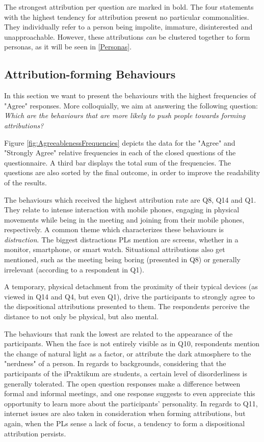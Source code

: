 The strongest attribution per question are marked in bold. The four statements with the highest tendency for attribution present no particular commonalities. They individually refer to a person being impolite, immature, disinterested and unapproachable. However, these attributions \textit{can} be clustered together to form personas, as it will be seen in \autoref{Personas}.

\subsection{Attribution-forming Behaviours}

In this section we want to present the behaviours with the highest frequencies of "Agree" responses. More colloquially, we aim at answering the following question: \textit{Which are the behaviours that are more likely to push people towards forming attributions?}

Figure \ref{fig:AgreeablenessFrequencies} depicts the data for the "Agree" and "Strongly Agree" relative frequencies in each of the closed questions of the questionnaire. A third bar displays the total sum of the frequencies. The questions are also sorted by the final outcome, in order to improve the readability of the results.

The behaviours which received the highest attribution rate are Q8, Q14 and Q1. They relate to intense interaction with mobile phones, engaging in physical movements while being in the meeting and joining from their mobile phones, respectively. A common theme which characterizes these behaviours is \textit{distraction}. The biggest distractions PLs mention are screens, whether in a monitor, smartphone, or smart watch. Situational attributions also get mentioned, such as the meeting being boring (presented in Q8) or generally irrelevant (according to a respondent in Q1).

A temporary, physical detachment from the proximity of their typical devices (as viewed in Q14 and Q4, but even Q1), drive the participants to strongly agree to the dispositional attributions presented to them. The respondents perceive the distance to not only be physical, but also mental.

The behaviours that rank the lowest are related to the appearance of the participants. When the face is not entirely visible as in Q10, respondents mention the change of natural light as a factor, or attribute the dark atmosphere to the "nerdness" of a person. In regards to backgrounds, considering that the participants of the iPraktikum are students, a certain level of disorderliness is generally tolerated. The open question responses make a difference between formal and informal meetings, and one response suggests to even appreciate this opportunity to learn more about the participants' personality. In regards to Q11, internet issues are also taken in consideration when forming attributions, but again, when the PLs sense a lack of focus, a tendency to form a dispositional attribution persists.


